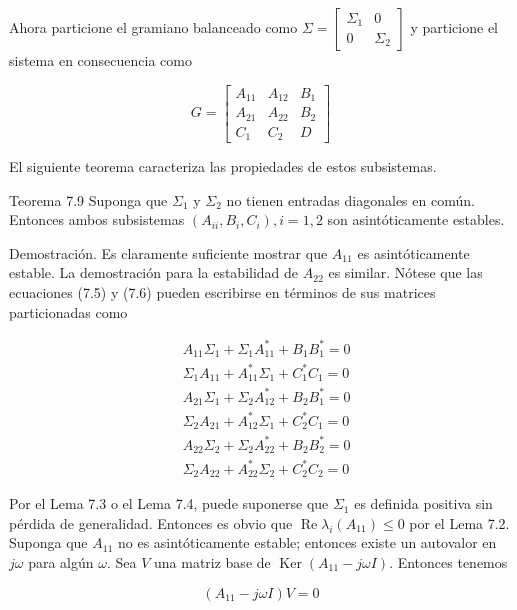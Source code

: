 Ahora particione el gramiano balanceado como $\Sigma=\left[\begin{array}{cc}\Sigma_{1} & 0 \\ 0 & \Sigma_{2}\end{array}\right]$ y particione el sistema en consecuencia como

$$
G=\left[\begin{array}{cc|c}
A_{11} & A_{12} & B_{1} \\
A_{21} & A_{22} & B_{2} \\
\hline C_{1} & C_{2} & D
\end{array}\right]
$$

El siguiente teorema caracteriza las propiedades de estos subsistemas.

Teorema 7.9 Suponga que $\Sigma_{1}$ y $\Sigma_{2}$ no tienen entradas diagonales en común. Entonces ambos subsistemas $\left(A_{i i}, B_{i}, C_{i}\right), i=1,2$ son asintóticamente estables.

Demostración. Es claramente suficiente mostrar que $A_{11}$ es asintóticamente estable. La demostración para la estabilidad de $A_{22}$ es similar. Nótese que las ecuaciones (7.5) y (7.6) pueden escribirse en términos de sus matrices particionadas como


\begin{align*}
& A_{11} \Sigma_{1}+\Sigma_{1} A_{11}^{*}+B_{1} B_{1}^{*}=0  \tag{7.7}\\
& \Sigma_{1} A_{11}+A_{11}^{*} \Sigma_{1}+C_{1}^{*} C_{1}=0  \tag{7.8}\\
& A_{21} \Sigma_{1}+\Sigma_{2} A_{12}^{*}+B_{2} B_{1}^{*}=0  \tag{7.9}\\
& \Sigma_{2} A_{21}+A_{12}^{*} \Sigma_{1}+C_{2}^{*} C_{1}=0  \tag{7.10}\\
& A_{22} \Sigma_{2}+\Sigma_{2} A_{22}^{*}+B_{2} B_{2}^{*}=0  \tag{7.11}\\
& \Sigma_{2} A_{22}+A_{22}^{*} \Sigma_{2}+C_{2}^{*} C_{2}=0 \tag{7.12}
\end{align*}


Por el Lema 7.3 o el Lema 7.4, puede suponerse que $\Sigma_{1}$ es definida positiva sin pérdida de generalidad. Entonces es obvio que $\operatorname{Re} \lambda_{i}\left(A_{11}\right) \leq 0$ por el Lema 7.2. Suponga que $A_{11}$ no es asintóticamente estable; entonces existe un autovalor en $j \omega$ para algún $\omega$. Sea $V$ una matriz base de $\operatorname{Ker}\left(A_{11}-j \omega I\right)$. Entonces tenemos


\begin{equation*}
\left(A_{11}-j \omega I\right) V=0 \tag{7.13}
\end{equation*}


